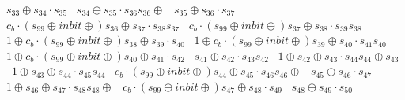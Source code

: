 \documentclass[11pt, a4paper]{article}
\begin{document}
 $s_{33} \oplus s_{34} \cdot s_{35}$ \
 $s_{34} \oplus s_{35} \cdot s_{36}s_{36} \oplus $ \
 $s_{35} \oplus s_{36} \cdot s_{37}$ \
 $c_{b} \cdot (s_{99} \oplus inbit \oplus )s_{36} \oplus s_{37} \cdot s_{38}s_{37}$ \
 $c_{b} \cdot (s_{99} \oplus inbit \oplus )s_{37} \oplus s_{38} \cdot s_{39}s_{38}$ \
 $1 \oplus c_{b} \cdot (s_{99} \oplus inbit \oplus )s_{38} \oplus s_{39} \cdot s_{40}$ \
 $1 \oplus c_{b} \cdot (s_{99} \oplus inbit \oplus )s_{39} \oplus s_{40} \cdot s_{41}s_{40}$ \
 $1 \oplus c_{b} \cdot (s_{99} \oplus inbit \oplus )s_{40} \oplus s_{41} \cdot s_{42}$ \
 $s_{41} \oplus s_{42} \cdot s_{43}s_{42}$ \
 $1 \oplus s_{42} \oplus s_{43} \cdot s_{44}s_{44} \oplus s_{43}$ \
 $1 \oplus s_{43} \oplus s_{44} \cdot s_{45}s_{44}$ \
 $c_{b} \cdot (s_{99} \oplus inbit \oplus )s_{44} \oplus s_{45} \cdot s_{46}s_{46} \oplus $ \
 $s_{45} \oplus s_{46} \cdot s_{47}$ \
 $1 \oplus s_{46} \oplus s_{47} \cdot s_{48}s_{48} \oplus $ \
 $c_{b} \cdot (s_{99} \oplus inbit \oplus )s_{47} \oplus s_{48} \cdot s_{49}$ \
 $s_{48} \oplus s_{49} \cdot s_{50}$ \
 
\end{document}
